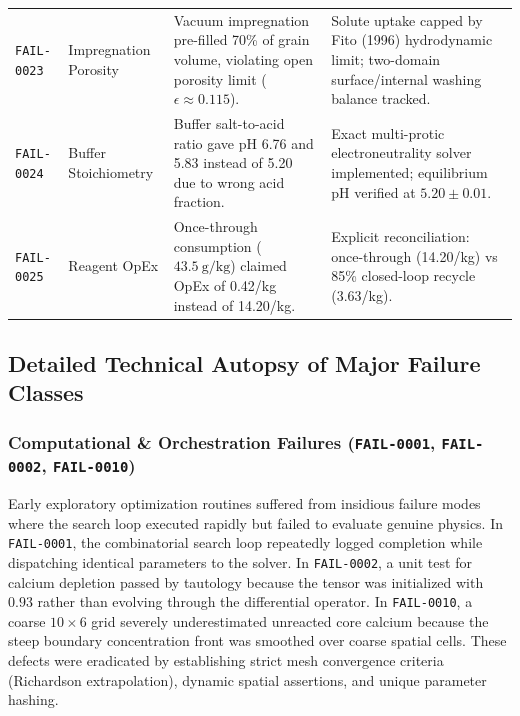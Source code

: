 \documentclass[10pt,a4paper]{article}
\newcommand{\inr}{\text{INR~}}
\begin{document}
\begin{longtable}{p{1.7cm}p{3.2cm}p{4.2cm}>{\raggedright\arraybackslash}p{6.5cm}}
\texttt{FAIL-0023} & Impregnation Porosity & Vacuum impregnation pre-filled 70\% of grain volume, violating open porosity limit ($\epsilon \approx 0.115$). & Solute uptake capped by Fito (1996) hydrodynamic limit; two-domain surface/internal washing balance tracked. \\

\texttt{FAIL-0024} & Buffer Stoichiometry & Buffer salt-to-acid ratio gave pH 6.76 and 5.83 instead of 5.20 due to wrong acid fraction. & Exact multi-protic electroneutrality solver implemented; equilibrium pH verified at $5.20 \pm 0.01$. \\

\texttt{FAIL-0025} & Reagent OpEx & Once-through consumption ($43.5\ \mathrm{g/kg}$) claimed OpEx of \inr0.42/kg instead of \inr14.20/kg. & Explicit reconciliation: once-through (\inr14.20/kg) vs 85\% closed-loop recycle (\inr3.63/kg). \\

\end{longtable}

\subsection{Detailed Technical Autopsy of Major Failure Classes}

\subsubsection{Computational \& Orchestration Failures (\texttt{FAIL-0001}, \texttt{FAIL-0002}, \texttt{FAIL-0010})}
Early exploratory optimization routines suffered from insidious failure modes where the search loop executed rapidly but failed to evaluate genuine physics. In \texttt{FAIL-0001}, the combinatorial search loop repeatedly logged completion while dispatching identical parameters to the solver. In \texttt{FAIL-0002}, a unit test for calcium depletion passed by tautology because the tensor was initialized with $0.93$ rather than evolving through the differential operator. In \texttt{FAIL-0010}, a coarse $10 \times 6$ grid severely underestimated unreacted core calcium because the steep boundary concentration front was smoothed over coarse spatial cells. These defects were eradicated by establishing strict mesh convergence criteria (Richardson extrapolation), dynamic spatial assertions, and unique parameter hashing.
\end{document}
